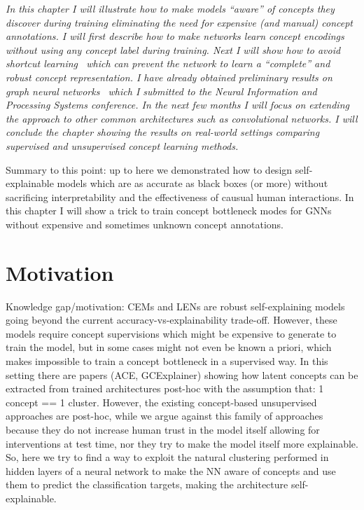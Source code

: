 \documentclass[withindex,glossary]{cam-thesis}
\begin{document}
\textit{In this chapter I will illustrate how to make models ``aware'' of concepts they discover during training eliminating the need for expensive (and manual) concept annotations. I will first describe how to make networks learn concept encodings without using any concept label during training. Next I will show how to avoid \textit{shortcut learning}~\citep{geirhos2020shortcut} which can prevent the network to learn a ``complete'' and robust concept representation. I have already obtained preliminary results on graph neural networks~\citep{magister2022encoding} which I submitted to the Neural Information and Processing Systems conference. In the next few months I will focus on extending the approach to other common architectures such as convolutional networks. I will conclude the chapter showing the results on real-world settings comparing supervised and unsupervised concept learning methods.}


Summary to this point: up to here we demonstrated how to design self-explainable models which are as accurate as black boxes (or more) without sacrificing interpretability and the effectiveness of causual human interactions. In this chapter I will show a trick to train concept bottleneck modes for GNNs without expensive and sometimes unknown concept annotations.

\section{Motivation}
Knowledge gap/motivation: CEMs and LENs are robust self-explaining models going beyond the current accuracy-vs-explainability trade-off. However, these models require concept supervisions which might be expensive to generate to train the model, but in some cases might not even be known a priori, which makes impossible to train a concept bottleneck in a supervised way. In this setting there are papers (ACE, GCExplainer) showing how latent concepts can be extracted from trained architectures post-hoc with the assumption that: 1 concept == 1 cluster. However, the existing concept-based unsupervised approaches are post-hoc, while we argue against this family of approaches because they do not increase human trust in the model itself allowing for interventions at test time, nor they try to make the model itself more explainable. So, here we try to find a way to exploit the natural clustering performed in hidden layers of a neural network to make the NN aware of concepts and use them to predict the classification targets, making the architecture self-explainable.
\end{document}
